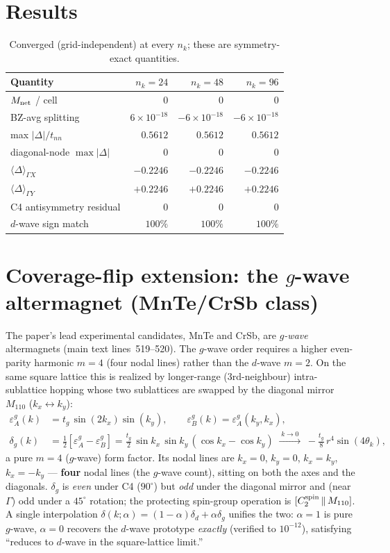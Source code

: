 \documentclass[11pt]{article}
\begin{document}
\section{Results}
\begin{table}[h]\centering
\begin{tabular}{lrrr}
\toprule
Quantity & $n_k=24$ & $n_k=48$ & $n_k=96$\\
\midrule
$M_{\rm net}$ / cell & $0$ & $0$ & $0$\\
BZ-avg splitting & $6\!\times\!10^{-18}$ & $-6\!\times\!10^{-18}$ & $-6\!\times\!10^{-18}$\\
max $|\Delta|/t_{nn}$ & $0.5612$ & $0.5612$ & $0.5612$\\
diagonal-node $\max|\Delta|$ & $0$ & $0$ & $0$\\
$\langle\Delta\rangle_{\Gamma X}$ & $-0.2246$ & $-0.2246$ & $-0.2246$\\
$\langle\Delta\rangle_{\Gamma Y}$ & $+0.2246$ & $+0.2246$ & $+0.2246$\\
C4 antisymmetry residual & $0$ & $0$ & $0$\\
$d$-wave sign match & $100\%$ & $100\%$ & $100\%$\\
\bottomrule
\end{tabular}
\caption{Converged (grid-independent) at every $n_k$; these are symmetry-exact quantities.}
\end{table}

\section{Coverage-flip extension: the $g$-wave altermagnet (MnTe/CrSb class)}
The paper's lead experimental candidates, MnTe and CrSb, are \emph{$g$-wave} altermagnets
(main text lines~519--520). The $g$-wave order requires a higher even-parity harmonic $m=4$
(four nodal lines) rather than the $d$-wave $m=2$. On the same square lattice this is realized by
longer-range (3rd-neighbour) intra-sublattice hopping whose two sublattices are swapped by the
diagonal mirror $M_{110}$ ($k_x\!\leftrightarrow\!k_y$):
\begin{align}
\varepsilon_A^{g}(k)&=t_g\,\sin(2k_x)\sin(k_y),\qquad \varepsilon_B^{g}(k)=\varepsilon_A^{g}(k_y,k_x),\\
\delta_g(k)&=\tfrac12[\varepsilon_A^{g}-\varepsilon_B^{g}]
   =\tfrac{t_g}{2}\,\sin k_x\,\sin k_y\,(\cos k_x-\cos k_y)
   \;\xrightarrow{\;k\to0\;}\; -\tfrac{t_g}{8}\,r^4\sin(4\theta_k),
\end{align}
a pure $m=4$ ($g$-wave) form factor. Its nodal lines are $k_x=0$, $k_y=0$, $k_x=k_y$, $k_x=-k_y$
--- \textbf{four} nodal lines (the $g$-wave count), sitting on both the axes and the diagonals.
$\delta_g$ is \emph{even} under C4 ($90^\circ$) but \emph{odd} under the diagonal mirror and (near
$\Gamma$) odd under a $45^\circ$ rotation; the protecting spin-group operation is
$[C_2^{\rm spin}\,\|\,M_{110}]$. A single interpolation
$\delta(k;\alpha)=(1-\alpha)\delta_d+\alpha\delta_g$ unifies the two: $\alpha=1$ is pure $g$-wave,
$\alpha=0$ recovers the $d$-wave prototype \emph{exactly} (verified to $10^{-12}$), satisfying
``reduces to $d$-wave in the square-lattice limit.''
\end{document}
